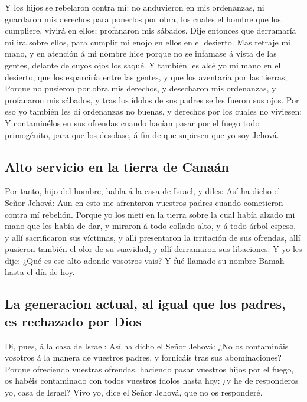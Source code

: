  Y los hijos se rebelaron contra mí: no anduvieron en mis
ordenanzas, ni guardaron mis derechos para ponerlos por obra, los cuales
el hombre que los cumpliere, vivirá en ellos; profanaron mis sábados.
Dije entonces que derramaría mi ira sobre ellos, para cumplir mi enojo
en ellos en el desierto.  Mas retraje mi mano, y en
atención á mi nombre hice porque no se infamase á vista de las gentes,
delante de cuyos ojos los saqué.  Y también les alcé yo
mi mano en el desierto, que los esparciría entre las gentes, y que los
aventaría por las tierras;  Porque no pusieron por obra
mis derechos, y desecharon mis ordenanzas, y profanaron mis sábados, y
tras los ídolos de sus padres se les fueron sus ojos. 
Por eso yo también les dí ordenanzas no buenas, y derechos por los
cuales no viviesen;  Y contaminélos en sus ofrendas
cuando hacían pasar por el fuego todo primogénito, para que los
desolase, á fin de que supiesen que yo soy Jehová.

\hypertarget{alto-servicio-en-la-tierra-de-canauxe1n}{%
\subsection{Alto servicio en la tierra de
Canaán}\label{alto-servicio-en-la-tierra-de-canauxe1n}}

 Por tanto, hijo del hombre, habla á la casa de Israel, y
diles: Así ha dicho el Señor Jehová: Aun en esto me afrentaron vuestros
padres cuando cometieron contra mí rebelión.  Porque yo
los metí en la tierra sobre la cual había alzado mi mano que les había
de dar, y miraron á todo collado alto, y á todo árbol espeso, y allí
sacrificaron sus víctimas, y allí presentaron la irritación de sus
ofrendas, allí pusieron también el olor de su suavidad, y allí
derramaron sus libaciones.  Y yo les dije: ¿Qué es ese
alto adonde vosotros vais? Y fué llamado su nombre Bamah hasta el día de
hoy.

\hypertarget{la-generacion-actual-al-igual-que-los-padres-es-rechazado-por-dios}{%
\subsection{La generacion actual, al igual que los padres, es rechazado
por
Dios}\label{la-generacion-actual-al-igual-que-los-padres-es-rechazado-por-dios}}

 Di, pues, á la casa de Israel: Así ha dicho el Señor
Jehová: ¿No os contamináis vosotros á la manera de vuestros padres, y
fornicáis tras sus abominaciones?  Porque ofreciendo
vuestras ofrendas, haciendo pasar vuestros hijos por el fuego, os habéis
contaminado con todos vuestros ídolos hasta hoy: ¿y he de responderos
yo, casa de Israel? Vivo yo, dice el Señor Jehová, que no os responderé.


